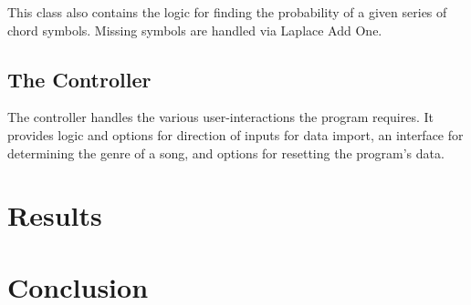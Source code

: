 \documentclass{article}
\begin{document}
		This class also contains the logic for finding the probability of a given 
		series of chord symbols.  Missing symbols are handled via Laplace Add One.

	\subsection{The Controller}
	The controller handles the various user-interactions the program requires.  
	It provides logic and options for direction of inputs for data import, an 
	interface for determining the genre of a song, and options for resetting 
	the program's data.

\newpage

\section{Results}

\newpage

\section{Conclusion}
\end{document}
